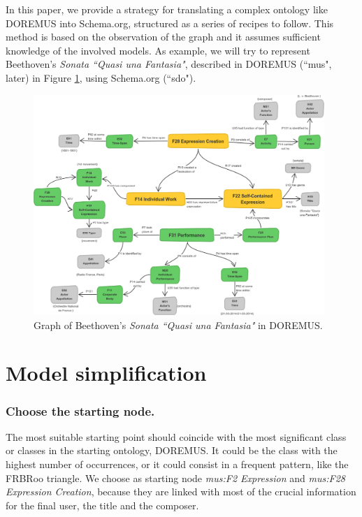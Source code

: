 \documentclass{llncs}
\begin{document}
In this paper, we provide a strategy for translating a complex ontology like DOREMUS into Schema.org, structured as a series of recipes to follow.
This method is based on the observation of the graph and it assumes sufficient knowledge of the involved models. As example, we will try to represent Beethoven's \textit{Sonata ``Quasi una Fantasia"}, described in DOREMUS (``mus", later) in Figure \ref{fig:beet-doremus}, using Schema.org (``sdo").

\begin{figure}
\includegraphics[width=11cm]{img/Beethoven-Doremus.png}
\centering
\caption{Graph of Beethoven's \textit{Sonata ``Quasi una Fantasia"} in DOREMUS.}
\label{fig:beet-doremus}
\end{figure}



\section{Model simplification}
\label{sec:simplification}

\subsubsection{Choose the starting node.}
The most suitable starting point should coincide with the most significant class or classes in the starting ontology, DOREMUS. It could be the class with the highest number of occurrences, or it could consist in a frequent pattern, like the FRBRoo triangle. We choose as starting node \textit{mus:F2 Expression} and \textit{mus:F28 Expression Creation}, because they are linked with most of the crucial information for the final user, the title and the composer.
\end{document}
